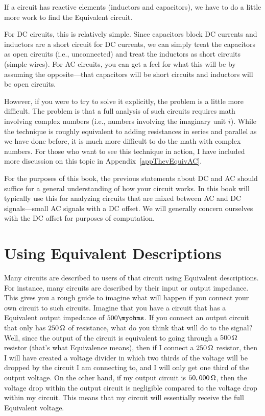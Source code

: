 If a circuit has reactive elements (inductors and capacitors), we have to do a little more work to find the \thev Equivalent circuit.

For DC circuits, this is relatively simple. 
Since capacitors block DC currents and inductors are a short circuit for DC currents, we can simply treat the capacitors as open circuits (i.e., unconnected) and treat the inductors as short circuits (simple wires).
For AC circuits, you can get a feel for what this will be by assuming the opposite---that capacitors will be short circuits and inductors will be open circuits.

However, if you were to try to solve it explicitly, the problem is a little more difficult.
The problem is that a full analysis of such circuits requires math involving complex numbers (i.e., numbers involving the imaginary unit $i$).  
While the technique is roughly equivalent to adding resistances in series and parallel as we have done before, it is much more difficult to do the math with complex numbers.
For those who want to see this technique in action, I have included more discussion on this topic in Appendix~\ref{appThevEquivAC}.

For the purposes of this book, the previous statements about DC and AC should suffice for a general understanding of how your circuit works.
In this book will typically use this for analyzing circuits that are mixed between AC and DC signals---small AC signals with a DC offset.
We will generally concern ourselves with the DC offset for purposes of computation.

\section{Using \thev Equivalent Descriptions}

Many circuits are described to users of that circuit using \thev Equivalent descriptions.
For instance, many circuits are described by their input or output impedance.
This gives you a rough guide to imagine what will happen if you connect your own circuit to such circuits.
Imagine that you have a circuit that has a \thev Equivalent output impedance of $500\myohms$.
If you connect an output circuit that only has $250\,\si{\ohm}$ of resistance, what do you think that will do to the signal?
Well, since the output of the circuit is equivalent to going through a $500\,\si{\ohm}$ resistor (that's what \thev Equivalence means), then if I connect a $250\,\si{\ohm}$ resistor, then I will have created a voltage divider in which two thirds of the voltage will be dropped by the circuit I am connecting to, and I will only get one third of the output voltage.
On the other hand, if my output circuit is $50,000\,\si{\ohm}$, then the voltage drop within the output circuit is negligible compared to the voltage drop within my circuit.
This means that my circuit will essentially receive the full \thev Equivalent voltage.

